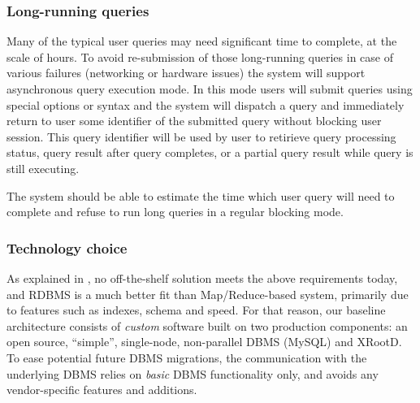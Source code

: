 \documentclass[DM,lsstdraft,toc]{lsstdoc}
\begin{document}
\subsubsection{Long-running queries}\label{long-running-queries}

Many of the typical user queries may need significant time to complete,
at the scale of hours. To avoid re-submission of those long-running
queries in case of various failures (networking or hardware issues) the
system will support asynchronous query execution mode. In this mode
users will submit queries using special options or syntax and the system
will dispatch a query and immediately return to user some identifier of
the submitted query without blocking user session. This query identifier
will be used by user to retirieve query processing status, query result
after query completes, or a partial query result while query is still
executing.

The system should be able to estimate the time which user query will
need to complete and refuse to run long queries in a regular blocking
mode.

\subsubsection{Technology choice}\label{technology-choice}

As explained in ,
no off-the-shelf solution meets the above requirements today, and RDBMS
is a much better fit than Map/Reduce-based system, primarily due to
features such as indexes, schema and speed. For that reason, our
baseline architecture consists of \emph{custom} software built on two
production components: an open source, ``simple'', single-node,
non-parallel DBMS (MySQL) and XRootD. To ease
potential future DBMS migrations, the communication with the underlying
DBMS relies on \emph{basic} DBMS functionality only, and avoids any
vendor-specific features and additions.
\end{document}

